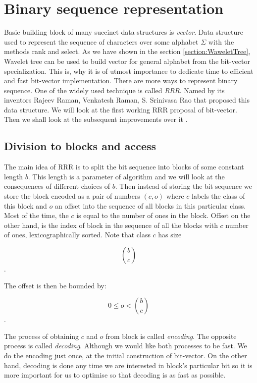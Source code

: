 \chapter{Binary sequence representation}
\label{kap:kap2}

Basic building block of many succinct data structures is \textit{vector}. Data structure
used to represent the sequence of characters over some alphabet $\Sigma$ with the
methods rank and select. As we
have shown in the section \ref{section:WaweletTree}, Wavelet tree can be used to
build vector for general alphabet from the bit-vector specialization. This is, why
it is of utmost importance to dedicate time to efficient and fast bit-vector
implementation. There are more ways to represent binary sequence. One of the widely
used technique is called \textit{RRR}. Named by its inventors Rajeev Raman, Venkatesh Raman,
S. Srinivasa Rao that proposed this data structure\cite{raman2007succinct}. We will look
at the first working RRR proposal of bit-vector\cite{claude2008practical}. Then we
shall look at the subsequent improvements over it \cite{navarro2012fast}.

\section{Division to blocks and access}

The main idea of RRR is to split the bit sequence into blocks of some constant
length $b$. This length is a parameter of algorithm and we will look at the consequences
of different choices of $b$. Then instead of storing the bit sequence we store the
block encoded as a pair of numbers $(c, o)$ where $c$ labels the class of this
block and $o$ an offset into the sequence of all blocks in this particular class.
Most of the time, the $c$ is equal to the number of ones in the block. Offset on
the other hand, is the index of block in the sequence of all the blocks with $c$ number
of ones, lexicographically sorted. Note that class $c$ has size

                $${b\choose c}$$.

The offset is then be bounded by:

				$$0 \leq o < {b\choose c}$$.

The process of obtaining $c$ and $o$ from block is called \textit{encoding}.
The opposite process is called \textit{decoding}. Although we would like both
processes to be fast. We do the encoding just once, at the initial construction
of bit-vector. On the other hand, decoding is done any time we are interested in
block's particular bit so it is more important for us to optimise so that decoding
is as fast as possible.

